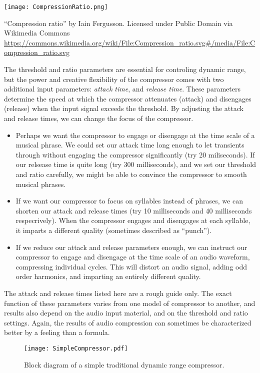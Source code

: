 \begin{marginfigure}
  \texttt{[image: CompressionRatio.png]}
  \caption{``Compression ratio'' by Iain Fergusson. Licensed under
     Public Domain via Wikimedia Commons 
     \url{https://commons.wikimedia.org/wiki/File:Compression_ratio.svg\#/media/File:Compression_ratio.svg}
   }
  \label{fig:comp-ratio}
\end{marginfigure}

The threshold and ratio parameters are essential for controling dynamic
range, but the power and creative flexibility of the compressor comes
with two additional input parameters: \textit{attack time}, and
\textit{release time}. These parameters determine the speed at which
the compressor attenuates (attack) and disengages (release) when the
input signal exceeds the threshold. By adjusting the attack and
release times, we can change the focus of the compressor.
\begin{itemize}
\item Perhaps we want the compressor to engage or disengage at the
  time scale of a musical phrase. We could set our attack time long
  enough to let transients through without engaging the compressor
  significantly (try 20 miliseconds). If our relsease time is quite
  long (try 300 milliseconds), and we set our threshold and ratio
  carefully, we might be able to convince the compressor to smooth
  musical phrases.
\item If we want our compressor to focus on syllables instead of
  phrases, we can shorten our attack and release times (try 10
  milliseconds and 40 milliseconds respecrively). When the compressor
  engages and disengages at each syllable, it imparts a different
  quality (sometimes described as ``punch'').
\item If we reduce our attack and release parameters enough, we can
  instruct our compressor to engage and disengage at the time scale of
  an audio waveform, compressing individual cycles. This will distort
  an audio signal, adding odd order harmonics, and
imparting an entirely different quality.
\end{itemize}
The attack and release times listed here are a rough guide only.  The
exact function of these parameters varies from one model of compressor
to another, and results also depend on the audio input material, and
on the threshold and ratio settings. Again, the results of audio
compression can sometimes be characterized better by a feeling than a
formula.

\begin{figure*}
  \texttt{[image: SimpleCompressor.pdf]}
  \caption{Block diagram of a simple traditional dynamic range
    compressor.}
  \label{fig:comp-block}
\end{figure*}


